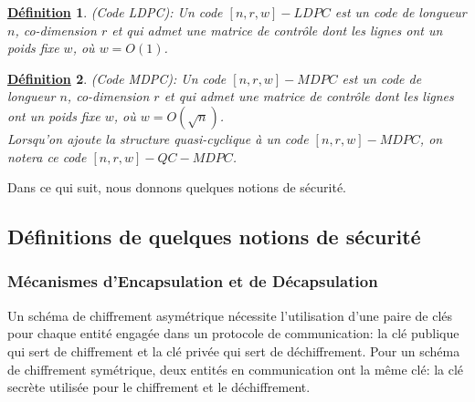 \documentclass[12pt,openany]{report}
\newtheorem{definition}{\underline{Définition}}
\begin{document}
\begin{definition}(Code LDPC): Un code $[n,r,w]-LDPC$ est un code de longueur $n$, co-dimension $r$ et qui admet une matrice de contrôle dont les lignes ont un poids fixe $w$, où $ w=O(1)$.\\
\end{definition}

\begin{definition}(Code MDPC): Un code $[n,r,w]-MDPC$ est un code de longueur $n$, co-dimension $r$ et qui admet une matrice de contrôle dont les lignes ont un poids fixe $w$, où $ w=O(\sqrt{n})$.\\
Lorsqu'on ajoute la structure quasi-cyclique à un code $[n,r,w]-MDPC$, on notera ce code $[n,r,w]-QC-MDPC$.
\end{definition}
Dans ce qui suit, nous donnons quelques notions de sécurité.
\subsection{Définitions de quelques notions de sécurité}
\subsubsection{Mécanismes d'Encapsulation et de Décapsulation}

Un schéma de chiffrement asymétrique nécessite l'utilisation d'une paire de clés pour chaque entité engagée dans un protocole de communication: la clé publique qui sert de chiffrement et la clé privée qui sert de déchiffrement. Pour un schéma de chiffrement symétrique, deux entités en communication ont la même clé: la clé secrète utilisée pour le chiffrement et le déchiffrement.\\
\end{document}

